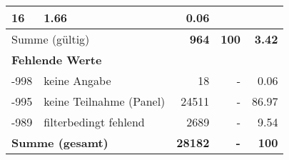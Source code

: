 \begin{longtable}{lXrrr}
       \num{16} &
       \num[round-mode=places,round-precision=2]{1.66} &
         \num[round-mode=places,round-precision=2]{0.06} \\
     \midrule
     \multicolumn{2}{l}{Summe (gültig)} &
       \textbf{\num{964}} &
     \textbf{\num{100}} &
       \textbf{\num[round-mode=places,round-precision=2]{3.42}} \\
     \multicolumn{5}{l}{\textbf{Fehlende Werte}}\\
       -998 &
       keine Angabe &
         \num{18} &
        - &
         \num[round-mode=places,round-precision=2]{0.06} \\
       -995 &
       keine Teilnahme (Panel) &
         \num{24511} &
        - &
         \num[round-mode=places,round-precision=2]{86.97} \\
       -989 &
       filterbedingt fehlend &
         \num{2689} &
        - &
         \num[round-mode=places,round-precision=2]{9.54} \\
     \midrule
     \multicolumn{2}{l}{\textbf{Summe (gesamt)}} &
          \textbf{\num{28182}} &
        \textbf{-} &
        \textbf{\num{100}} \\
     \bottomrule
     \end{longtable}
     
